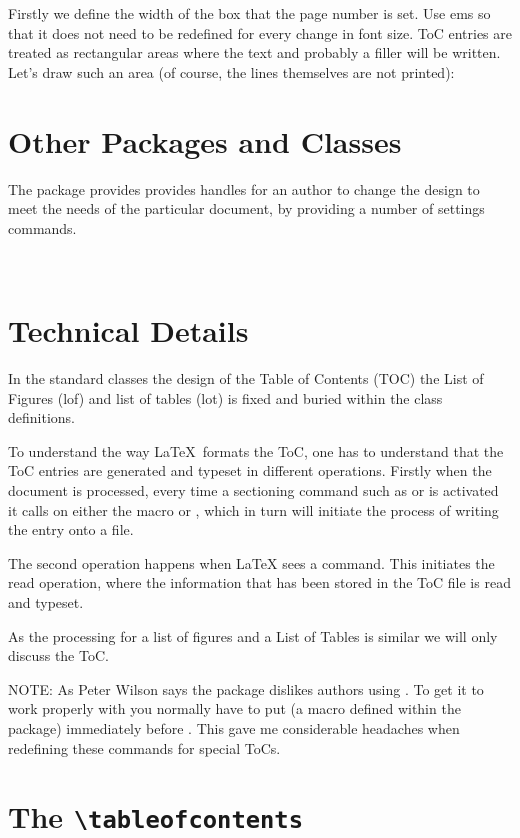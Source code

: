 Firstly we define the width of the box that the page number is set. Use ems so that it does not need to be redefined for every change in font size.
ToC entries are treated as rectangular areas where the text
and probably a filler will be written. Let's draw such an
area (of course, the lines themselves are not printed):



\section{Other Packages and Classes}
The package  provides  provides handles for an author to change the design to meet the needs of the particular document, by providing a number of settings commands.


^^A

\section{Technical Details}
In the standard classes the design of the Table of Contents (TOC) the List of Figures (lof) and list of tables (lot) is fixed and buried within the class definitions.

To understand the way \LaTeX\ formats the ToC, one has to understand that the ToC entries are generated and typeset in different operations. Firstly when the document is processed, every time a sectioning command such as  or  is activated it calls on either the macro  or , which in turn will initiate the process of writing the entry onto a file.

The second operation happens when LaTeX sees a  command. This initiates the read operation, where the information that has been stored in the ToC file is read and typeset.

As the processing for a list of figures and a List of Tables is similar we will only discuss the ToC.


 NOTE: As Peter Wilson says the  package dislikes authors using
. To get it to work properly with   you normally have to put  (a macro defined within  the  package) immediately  before . This gave me considerable headaches when redefining these commands for special ToCs.


\section{The \texttt{\textbackslash tableofcontents}}

